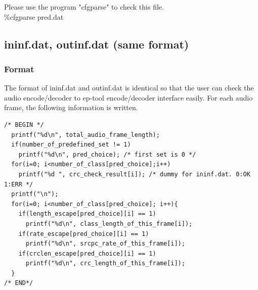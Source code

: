 \documentclass[a4paper]{article}
\begin{document}
Please use the program "cfgparse" to check this file.\\
  \%cfgparse pred.dat

\subsection{ininf.dat, outinf.dat (same format)}

\subsubsection{Format}

  The format of ininf.dat and outinf.dat is identical so that the user can check the audio encode/decoder to ep-tool encode/decoder interface easily.
  For each audio frame, the following information is written.\\

\begin{verbatim}
/* BEGIN */
  printf("%d\n", total_audio_frame_length);
  if(number_of_predefined_set != 1)
    printf("%d\n", pred_choice); /* first set is 0 */
  for(i=0; i<number_of_class[pred_choice];i++)
    printf("%d ", crc_check_result[i]); /* dummy for ininf.dat. 0:OK 1:ERR */
  printf("\n");
  for(i=0; i<number_of_class[pred_choice]; i++){
    if(length_escape[pred_choice][i] == 1)
      printf("%d\n", class_length_of_this_frame[i]);
    if(rate_escape[pred_choice][i] == 1)
      printf("%d\n", srcpc_rate_of_this_frame[i]);
    if(crclen_escape[pred_choice][i] == 1)
      printf("%d\n", crc_length_of_this_frame[i]);
  }
/* END*/

\end{verbatim}
\end{document}

